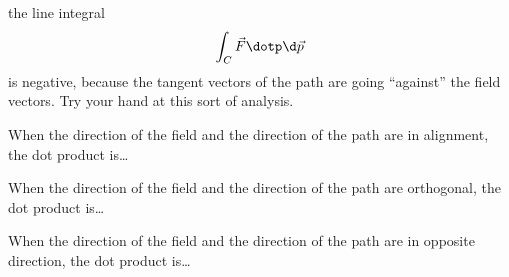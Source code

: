 \documentclass{ximera}
\begin{document}
the line integral
\[
\int_C \vec{F}\dotp\d\vec{p}
\]
is negative, because the tangent vectors of the path are going
``against'' the field vectors.  Try your hand at this sort of analysis.



\begin{question}
When the direction of the field and the direction of the path are in
alignment, the dot product is\dots
\begin{prompt}
  \begin{multipleChoice}
  \end{multipleChoice}
\end{prompt}
\begin{question}
  When the direction of the
  field and the direction of the path are orthogonal, the dot product is\dots
  \begin{prompt}
  \begin{multipleChoice}
  \end{multipleChoice}
\end{prompt}
\begin{question}
  When the direction of the field and the direction of the path are in
  opposite direction, the dot product is\dots
  \begin{prompt}
  \begin{multipleChoice}
  \end{multipleChoice}
  \end{prompt}
\end{question}
\end{question}
\end{question}
\end{document}
